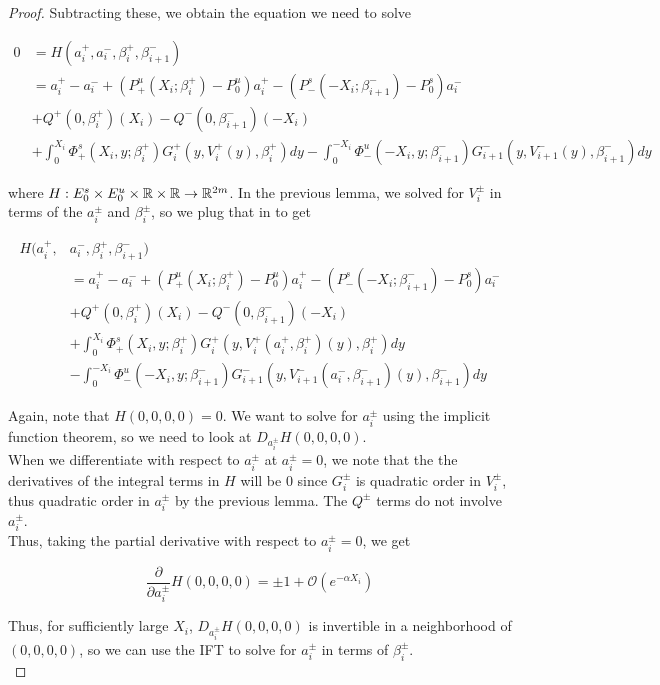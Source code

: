 \documentclass[thesis.tex]{subfiles}
\begin{document}
\begin{lemma}
\begin{proof}
Subtracting these, we obtain the equation we need to solve

\begin{align*}
0 &= H(a_i^+, a_i^-, \beta_i^+, \beta_{i+1}^-) \\
&= a_i^+ - a_i^- + (P^u_+(X_i; \beta_i^+) -  P^u_0)a_i^+ - (P^s_-(-X_i; \beta_{i+1}^-) - P^s_0) a_i^-  \\
&+ Q^+(0, \beta_i^+)(X_i) - Q^-(0, \beta_{i+1}^-)(-X_i)\\
&+ \int_0^{X_i} \Phi_+^s(X_i, y; \beta_i^+) G_i^+(y, V_i^+(y),\beta_i^+)dy
- \int_0^{-X_i} \Phi_-^u(-X_i, y; \beta_{i+1}^-) G_{i+1}^-(y, V_{i+1}^-(y),\beta_{i+1}^-)dy 
\end{align*}

where $H: E_0^s \times E_0^u \times {\mathbb R} \times {\mathbb R} \rightarrow {\mathbb R}^{2m}$. In the previous lemma, we solved for $V_i^\pm$ in terms of the $a_i^\pm$ and $\beta_i^\pm$, so we plug that in to get

\begin{align*}
H(a_i^+, &a_i^-, \beta_i^+, \beta_{i+1}^-) \\
&= a_i^+ - a_i^- + (P^u_+(X_i; \beta_i^+) -  P^u_0)a_i^+ - (P^s_-(-X_i; \beta_{i+1}^-) - P^s_0) a_i^-  \\
&+ Q^+(0, \beta_i^+)(X_i) - Q^-(0, \beta_{i+1}^-)(-X_i)\\
&+ \int_0^{X_i} \Phi_+^s(X_i, y; \beta_i^+) G_i^+(y, V_i^+(a_i^+, \beta_i^+)(y),\beta_i^+)dy \\
&- \int_0^{-X_i} \Phi_-^u(-X_i, y; \beta_{i+1}^-) G_{i+1}^-(y, V_{i+1}^-(a_i^-, \beta_{i+1}^-)(y),\beta_{i+1}^-)dy 
\end{align*}

Again, note that $H(0, 0, 0, 0) = 0$. We want to solve for $a_i^\pm$ using the implicit function theorem, so we need to look at $D_{a_i^\pm} H(0, 0, 0, 0)$.\\

When we differentiate with respect to $a_i^\pm$ at $a_i^\pm = 0$, we note that the the derivatives of the integral terms in $H$ will be 0 since $G_i^\pm$ is quadratic order in $V_i^\pm$, thus quadratic order in $a_i^\pm$ by the previous lemma. The $Q^\pm$ terms do not involve $a_i^\pm$.\\

Thus, taking the partial derivative with respect to $a_i^\pm = 0$, we get

\[
\frac{\partial}{\partial a_i^\pm} H(0, 0, 0, 0) = \pm 1 + \mathcal{O} (e^{-\alpha X_i})
\]

Thus, for sufficiently large $X_i$, $D_{a_i^\pm} H(0, 0, 0, 0)$ is invertible in a neighborhood of $(0, 0, 0, 0)$, so we can use the IFT to solve for $a_i^\pm$ in terms of $\beta_i^\pm$. \\


\end{proof}
\end{lemma}
\end{document}
